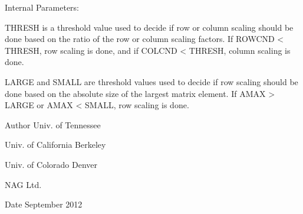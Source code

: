 \begin{DoxyParagraph}{Internal Parameters\+: }
\begin{DoxyVerb}  THRESH is a threshold value used to decide if row or column scaling
  should be done based on the ratio of the row or column scaling
  factors.  If ROWCND < THRESH, row scaling is done, and if
  COLCND < THRESH, column scaling is done.

  LARGE and SMALL are threshold values used to decide if row scaling
  should be done based on the absolute size of the largest matrix
  element.  If AMAX > LARGE or AMAX < SMALL, row scaling is done.\end{DoxyVerb}
 
\end{DoxyParagraph}
\begin{DoxyAuthor}{Author}
Univ. of Tennessee 

Univ. of California Berkeley 

Univ. of Colorado Denver 

N\+A\+G Ltd. 
\end{DoxyAuthor}
\begin{DoxyDate}{Date}
September 2012 
\end{DoxyDate}
